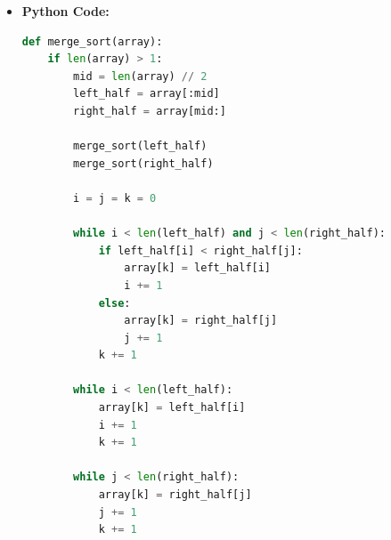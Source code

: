 \documentclass[12pt]{book} %
\begin{document}
\begin{itemize}
\begin{itemize}
\begin{algorithm}[H]
\begin{algorithmic}[1]
                        \State $j \gets j + 1$
                    \EndIf
                    \State $k \gets k + 1$
                \EndWhile
                    \State $array[k] \gets L[i]$
                    \State $i \gets i + 1$
                    \State $k \gets k + 1$
                \EndWhile
                    \State $array[k] \gets R[j]$
                    \State $j \gets j + 1$
                    \State $k \gets k + 1$
                \EndWhile
            \EndProcedure
            \end{algorithmic}
            \end{algorithm}
        \item \textbf{Python Code:}
        \begin{lstlisting}[language=Python]
def merge_sort(array):
    if len(array) > 1:
        mid = len(array) // 2
        left_half = array[:mid]
        right_half = array[mid:]

        merge_sort(left_half)
        merge_sort(right_half)

        i = j = k = 0

        while i < len(left_half) and j < len(right_half):
            if left_half[i] < right_half[j]:
                array[k] = left_half[i]
                i += 1
            else:
                array[k] = right_half[j]
                j += 1
            k += 1

        while i < len(left_half):
            array[k] = left_half[i]
            i += 1
            k += 1

        while j < len(right_half):
            array[k] = right_half[j]
            j += 1
            k += 1


\end{lstlisting}
\end{itemize}
\end{itemize}
\end{document}

